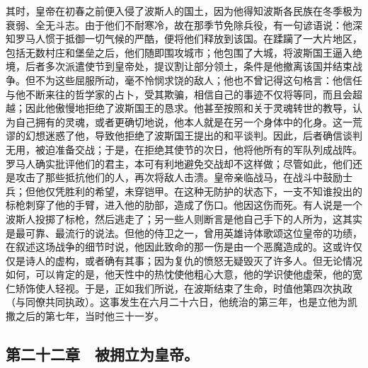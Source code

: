 其时，皇帝在初春之前便入侵了波斯人的国土，因为他得知波斯各民族在冬季极为衰弱、全无斗志。由于他们不耐寒冷，故在那季节免除兵役，有一句谚语说：他深知罗马人惯于抵御一切气候的严酷，便将他们释放到该国。在蹂躏了一大片地区，包括无数村庄和堡垒之后，他们随即围攻城市；他包围了大城，将波斯国王逼入绝境，后者多次派遣使节到皇帝处，提议割让部分领土，条件是他撤离该国并结束战争。但不为这些屈服所动，毫不怜悯求饶的敌人；他也不曾记得这句格言：他信任与他不断来往的哲学家的占卜，受其欺骗，相信自己的事迹不仅将等同，而且会超越；因此他傲慢地拒绝了波斯国王的恳求。他甚至按照和关于灵魂转世的教导，认为自己拥有的灵魂，或者更确切地说，他本人就是在另一个身体中的化身。这一荒谬的幻想迷惑了他，导致他拒绝了波斯国王提出的和平谈判。因此，后者确信谈判无用，被迫准备交战；于是，在拒绝其使节的次日，他将他所有的军队列成战阵。罗马人确实批评他们的君主，本可有利地避免交战却不这样做；尽管如此，他们还是攻击了那些抵抗他们的人，再次将敌人击溃。皇帝亲临战马，在战斗中鼓励士兵；但他仅凭胜利的希望，未穿铠甲。在这种无防护的状态下，一支不知谁投出的标枪刺穿了他的手臂，进入他的肋部，造成了伤口。他因这伤而死。有人说是一个波斯人投掷了标枪，然后逃走了；另一些人则断言是他自己手下的人所为，这其实是最可靠、最流行的说法。但他的侍卫之一，曾用英雄诗体歌颂这位皇帝的功绩，在叙述这场战争的细节时说，他因此致命的那一伤是由一个恶魔造成的。这或许仅仅是诗人的虚构，或者确有其事；因为复仇的愤怒无疑毁灭了许多人。但无论情况如何，可以肯定的是，他天性中的热忱使他粗心大意，他的学识使他虚荣，他的宽仁矫饰使人轻视。于是，正如我们所说，在波斯结束了生命，时值他第四次执政（与同僚共同执政）。这事发生在六月二十六日，他统治的第三年，也是立他为凯撒之后的第七年，当时他三十一岁。\par


\subsection{第二十二章　被拥立为皇帝。}

